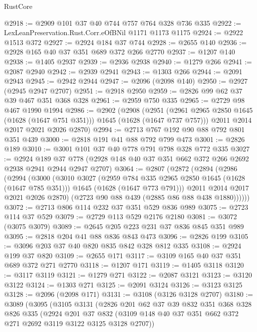 \begin{lexlean}{RustCore}
\begin{coremodule}
@2918 := @2909 @101 @37 @40 @744 @757 @764 @328 @736 @335
@2922 := LexLeanPreservation.Rust.Corr.eOfBNil @1171 @1173 @1175
@2924 := @2922 @1513 @372
@2927 := @2924 @184 @37 @744
@2928 := @2655 @140
@2936 := @2928 @165 @40 @37 @351 @689 @372 @266 @2770
@2937 := @1207 @140
@2938 := @1405 @2937
@2939 := @2936 @2938
@2940 := @1279 @266
@2941 := @2087 @2940
@2942 := @2939 @2941
@2943 := @1303 @266
@2944 := @2091 @2943
@2945 := @2942 @2944
@2947 := @2096 (@2098 @140)
@2950 := @2927 (@2945 @2947 @2707)
@2951 := @2918 @2950
@2959 := @2826 @99 @62 @37 @39 @467 @351 @368 @328
@2961 := @2959 @750 @335
@2965 := @2729 @98 @467 @1990 @1994
@2986 := @2902
    (@2908
      (@2951 (@2961 @2965 @2850 @1645 (@1628 (@1647 @751 @351))) @1645 (@1628 (@1647 @737 @757)))
      @2011
      @2014
      @2017
      @2021
      @2026
      @2870)
@2994 := @2713 @767 @192 @90 @88 @792 @801 @351 @439
@3000 := @2818 @191 @41 @88 @792 @799 @473
@3001 := @2826 @189
@3010 := @3001 @101 @37 @40 @778 @791 @798 @328 @772 @335
@3027 := @2924
    @189
    @37
    @778
    (@2928 @148 @40 @37 @351 @662 @372 @266 @2692 @2938 @2941 @2944 @2947 @2707)
@3064 := @2807
    (@2872
      (@2894
        (@2986
          (@2994
            (@3000
              (@3010
                @3027
                (@2959 @784 @335 @2965 @2850 @1645 (@1628 (@1647 @785 @351)))
                @1645
                (@1628 (@1647 @773 @791)))
              @2011
              @2014
              @2017
              @2021
              @2026
              @2870)
            (@2723 @90 @88 @439 (@2885 @86 @88 @438 @1880))))))
@3072 := @2713 @806 @114 @232 @37 @351 @529 @836 @989
@3075 := @2723 @114 @37 @529
@3079 := @2729 @113 @529 @2176 @2180
@3081 := @3072 (@3075 @3079)
@3089 := @2645 @205 @223 @231 @37 @836 @845 @351 @989
@3095 := @2818 @204 @41 @88 @836 @843 @473
@3096 := @2826 @199
@3105 := @3096 @203 @37 @40 @820 @835 @842 @328 @812 @335
@3108 := @2924 @199 @37 @820
@3109 := @2655 @171
@3117 := @3109 @165 @40 @37 @351 @689 @372 @271 @2770
@3118 := @1207 @171
@3119 := @1405 @3118
@3120 := @3117 @3119
@3121 := @1279 @271
@3122 := @2087 @3121
@3123 := @3120 @3122
@3124 := @1303 @271
@3125 := @2091 @3124
@3126 := @3123 @3125
@3128 := @2096 (@2098 @171)
@3131 := @3108 (@3126 @3128 @2707)
@3180 := @3089
    (@3095
      (@3105
        @3131
        (@2826
          @201
          @62
          @37
          @39
          @832
          @351
          @368
          @328
          @826
          @335
          (@2924
            @201
            @37
            @832
            (@3109 @148 @40 @37 @351 @662 @372 @271 @2692 @3119 @3122 @3125 @3128 @2707))

\end{coremodule}
\end{lexlean}
